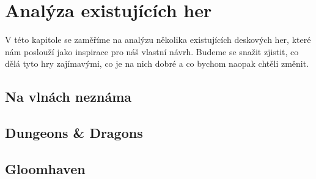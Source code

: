 \chapter{Analýza existujících her}
\label{chap:game_analysis}

V této kapitole se zaměříme na analýzu několika existujících deskových her, které nám poslouží jako inspirace pro náš vlastní návrh. Budeme se snažit zjistit, co dělá tyto hry zajímavými, co je na nich dobré a co bychom naopak chtěli změnit.

\section{Na vlnách neznáma}
\label{sec:forgotten_waters}

\section{Dungeons \& Dragons}
\label{sec:dnd}

\section{Gloomhaven}
\label{sec:gloomhaven}